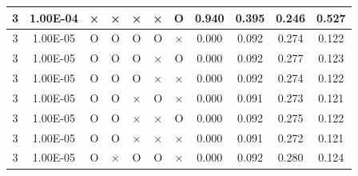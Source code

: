 \documentclass[11pt]{article}
\begin{document}
\begin{longtable}[h]{|r|r|l|l|l|l|l|r|r|l|r|}
\multicolumn{1}{|c|}{3} & \multicolumn{1}{c|}{1.00E-04} & \multicolumn{1}{c|}{×} & \multicolumn{1}{c|}{×} & \multicolumn{1}{c|}{×} & \multicolumn{1}{c|}{×} & \multicolumn{1}{c|}{O} & \multicolumn{1}{c|}{0.940} & \multicolumn{1}{c|}{0.395} & \multicolumn{1}{c|}{0.246} & \multicolumn{1}{c|}{0.527} \\ \hline
\multicolumn{1}{|c|}{3} & \multicolumn{1}{c|}{1.00E-05} & \multicolumn{1}{c|}{O} & \multicolumn{1}{c|}{O} & \multicolumn{1}{c|}{O} & \multicolumn{1}{c|}{O} & \multicolumn{1}{c|}{×} & \multicolumn{1}{c|}{0.000} & \multicolumn{1}{c|}{0.092} & \multicolumn{1}{c|}{0.274} & \multicolumn{1}{c|}{0.122} \\ \hline
\multicolumn{1}{|c|}{3} & \multicolumn{1}{c|}{1.00E-05} & \multicolumn{1}{c|}{O} & \multicolumn{1}{c|}{O} & \multicolumn{1}{c|}{O} & \multicolumn{1}{c|}{×} & \multicolumn{1}{c|}{O} & \multicolumn{1}{c|}{0.000} & \multicolumn{1}{c|}{0.092} & \multicolumn{1}{c|}{0.277} & \multicolumn{1}{c|}{0.123} \\ \hline
\multicolumn{1}{|c|}{3} & \multicolumn{1}{c|}{1.00E-05} & \multicolumn{1}{c|}{O} & \multicolumn{1}{c|}{O} & \multicolumn{1}{c|}{O} & \multicolumn{1}{c|}{×} & \multicolumn{1}{c|}{×} & \multicolumn{1}{c|}{0.000} & \multicolumn{1}{c|}{0.092} & \multicolumn{1}{c|}{0.274} & \multicolumn{1}{c|}{0.122} \\ \hline
\multicolumn{1}{|c|}{3} & \multicolumn{1}{c|}{1.00E-05} & \multicolumn{1}{c|}{O} & \multicolumn{1}{c|}{O} & \multicolumn{1}{c|}{×} & \multicolumn{1}{c|}{O} & \multicolumn{1}{c|}{×} & \multicolumn{1}{c|}{0.000} & \multicolumn{1}{c|}{0.091} & \multicolumn{1}{c|}{0.273} & \multicolumn{1}{c|}{0.121} \\ \hline
\multicolumn{1}{|c|}{3} & \multicolumn{1}{c|}{1.00E-05} & \multicolumn{1}{c|}{O} & \multicolumn{1}{c|}{O} & \multicolumn{1}{c|}{×} & \multicolumn{1}{c|}{×} & \multicolumn{1}{c|}{O} & \multicolumn{1}{c|}{0.000} & \multicolumn{1}{c|}{0.092} & \multicolumn{1}{c|}{0.275} & \multicolumn{1}{c|}{0.122} \\ \hline
\multicolumn{1}{|c|}{3} & \multicolumn{1}{c|}{1.00E-05} & \multicolumn{1}{c|}{O} & \multicolumn{1}{c|}{O} & \multicolumn{1}{c|}{×} & \multicolumn{1}{c|}{×} & \multicolumn{1}{c|}{×} & \multicolumn{1}{c|}{0.000} & \multicolumn{1}{c|}{0.091} & \multicolumn{1}{c|}{0.272} & \multicolumn{1}{c|}{0.121} \\ \hline
\multicolumn{1}{|c|}{3} & \multicolumn{1}{c|}{1.00E-05} & \multicolumn{1}{c|}{O} & \multicolumn{1}{c|}{×} & \multicolumn{1}{c|}{O} & \multicolumn{1}{c|}{O} & \multicolumn{1}{c|}{×} & \multicolumn{1}{c|}{0.000} & \multicolumn{1}{c|}{0.092} & \multicolumn{1}{c|}{0.280} & \multicolumn{1}{c|}{0.124} \\ \hline

\end{longtable}
\end{document}
